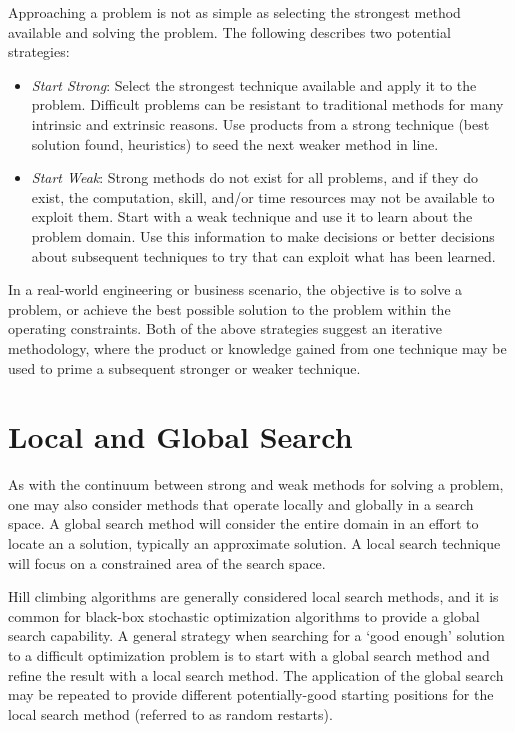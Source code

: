 \documentclass[a4paper, 11pt]{article}
\begin{document}
Approaching a problem is not as simple as selecting the strongest method available and solving the problem. The following describes two potential strategies:

\begin{itemize}
  \item \emph{Start Strong}: Select the strongest technique available and apply it to the problem. Difficult problems can be resistant to traditional methods for many intrinsic and extrinsic reasons. Use products from a strong technique (best solution found, heuristics) to seed the next weaker method in line. 
  \item \emph{Start Weak}: Strong methods do not exist for all problems, and if they do exist, the computation, skill, and/or time resources may not be available to exploit them. Start with a weak technique and use it to learn about the problem domain. Use this information to make decisions or better decisions about subsequent techniques to try that can exploit what has been learned.
\end{itemize}

In a real-world engineering or business scenario, the objective is to solve a problem, or achieve the best possible solution to the problem within the operating constraints.
Both of the above strategies suggest an iterative methodology, where the product or knowledge gained from one technique may be used to prime a subsequent stronger or weaker technique. 

%
% 
\section{Local and Global Search}
As with the continuum between strong and weak methods for solving a problem, one may also consider methods that operate locally and globally in a search space. A global search method will consider the entire domain in an effort to locate an a solution, typically an approximate solution. A local search technique will focus on a constrained area of the search space.

Hill climbing algorithms are generally considered local search methods, and it is common for black-box stochastic optimization algorithms to provide a global search capability.
A general strategy when searching for a `good enough' solution to a difficult optimization problem is to start with a global search method and refine the result with a local search method. The application of the global search may be repeated to provide different potentially-good starting positions for the local search method (referred to as random restarts).
\end{document}
